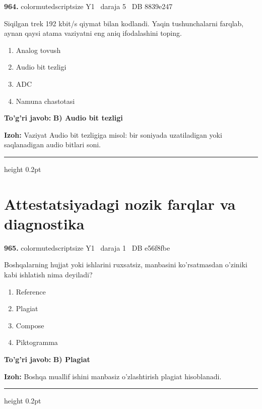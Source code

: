 \documentclass[10pt,a4paper,oneside]{article}
\begin{document}
\noindent\textbf{\color{ink}964.}  {color{muted}scriptsize Y1 \textbullet\ daraja 5 \textbullet\ DB 8839e247}
\par
Siqilgan trek 192 kbit/s qiymat bilan kodlandi. Yaqin tushunchalarni farqlab, aynan qaysi atama vaziyatni eng aniq ifodalashini toping.
\begin{enumerate}[label=\Alph*),leftmargin=9mm]
\item Analog tovush
\item Audio bit tezligi
\item ADC
\item Namuna chastotasi
\end{enumerate}
\begin{tcolorbox}[enhanced,breakable,colback=teal!4,colframe=teal!50!black,boxrule=0.5pt,arc=1.1mm,left=3mm,right=3mm,top=1.7mm,bottom=1.7mm,before skip=2mm,after skip=2mm]
\textbf{\color{teal}To'g'ri javob:} \textbf{B) Audio bit tezligi}
\par\smallskip
\textbf{Izoh:} Vaziyat Audio bit tezligiga misol: bir soniyada uzatiladigan yoki saqlanadigan audio bitlari soni.
\end{tcolorbox}
\vspace{2mm}\hrule height 0.2pt \vspace{3mm}
\section{Attestatsiyadagi nozik farqlar va diagnostika}

\noindent\textbf{\color{ink}965.}  {color{muted}scriptsize Y1 \textbullet\ daraja 1 \textbullet\ DB e56f8fbe}
\par
Boshqalarning hujjat yoki ishlarini ruxsatsiz, manbasini ko'rsatmasdan o'ziniki kabi ishlatish nima deyiladi?
\begin{enumerate}[label=\Alph*),leftmargin=9mm]
\item Reference
\item Plagiat
\item Compose
\item Piktogramma
\end{enumerate}
\begin{tcolorbox}[enhanced,breakable,colback=teal!4,colframe=teal!50!black,boxrule=0.5pt,arc=1.1mm,left=3mm,right=3mm,top=1.7mm,bottom=1.7mm,before skip=2mm,after skip=2mm]
\textbf{\color{teal}To'g'ri javob:} \textbf{B) Plagiat}
\par\smallskip
\textbf{Izoh:} Boshqa muallif ishini manbasiz o'zlashtirish plagiat hisoblanadi.
\end{tcolorbox}
\vspace{2mm}\hrule height 0.2pt \vspace{3mm}
\end{document}
